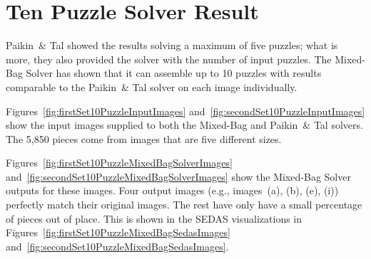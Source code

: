 \chapter{Ten Puzzle Solver Result}\label{chap:tenPuzzleSolving}

Paikin~\& Tal \cite{paikin2015} showed the results solving a maximum of five puzzles; what is more, they also provided the solver with the number of input puzzles.  The Mixed-Bag Solver has shown that it can assemble up to 10 puzzles with results comparable to the Paikin~\& Tal solver on each image individually.

Figures~\ref{fig:firstSet10PuzzleInputImages} and~\ref{fig:secondSet10PuzzleInputImages} show the input images supplied to both the Mixed-Bag and Paikin~\& Tal solvers. The 5,850 pieces come from images that are five different sizes.

Figures~\ref{fig:firstSet10PuzzleMixedBagSolverImages} and~\ref{fig:secondSet10PuzzleMixedBagSolverImages} show the Mixed-Bag Solver outputs for these images.  Four output images (e.g., images~(a), (b), (e), (i)) perfectly match their original images.  The rest have only have a small percentage of pieces out of place.  This is shown in the SEDAS visualizations in Figures~\ref{fig:firstSet10PuzzleMixedBagSedasImages} and~\ref{fig:secondSet10PuzzleMixedBagSedasImages}.

